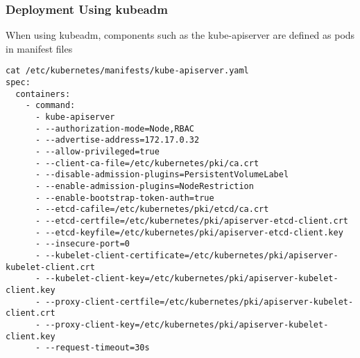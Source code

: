 \documentclass[11pt]{article}
\begin{document}
\subsubsection{Deployment Using kubeadm}
\label{sec:org8a06a46}
When using kubeadm, components such as the kube-apiserver are defined as pods in manifest files

\begin{verbatim}
cat /etc/kubernetes/manifests/kube-apiserver.yaml
spec:
  containers:
    - command:
      - kube-apiserver
      - --authorization-mode=Node,RBAC
      - --advertise-address=172.17.0.32
      - --allow-privileged=true
      - --client-ca-file=/etc/kubernetes/pki/ca.crt
      - --disable-admission-plugins=PersistentVolumeLabel
      - --enable-admission-plugins=NodeRestriction
      - --enable-bootstrap-token-auth=true
      - --etcd-cafile=/etc/kubernetes/pki/etcd/ca.crt
      - --etcd-certfile=/etc/kubernetes/pki/apiserver-etcd-client.crt
      - --etcd-keyfile=/etc/kubernetes/pki/apiserver-etcd-client.key
      - --insecure-port=0
      - --kubelet-client-certificate=/etc/kubernetes/pki/apiserver-kubelet-client.crt
      - --kubelet-client-key=/etc/kubernetes/pki/apiserver-kubelet-client.key
      - --proxy-client-certfile=/etc/kubernetes/pki/apiserver-kubelet-client.crt
      - --proxy-client-key=/etc/kubernetes/pki/apiserver-kubelet-client.key
      - --request-timeout=30s
\end{verbatim}
\end{document}
